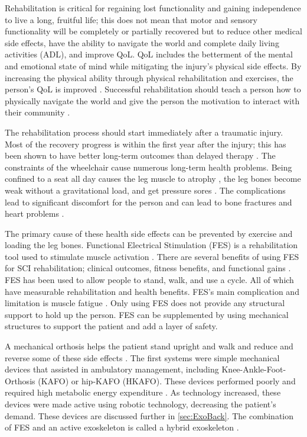  Rehabilitation is critical for regaining lost functionality and gaining independence to live a long, fruitful life; this does not mean that motor and sensory functionality will be completely or partially recovered but to reduce other medical side effects, have the ability to navigate the world and complete daily living activities (ADL), and improve QoL. QoL includes the betterment of the mental and emotional state of mind while mitigating the injury's physical side effects. By increasing the physical ability through physical rehabilitation and exercises, the person's QoL is improved \cite{noreau1995spinal}. Successful rehabilitation should teach a person how to physically navigate the world and give the person the motivation to interact with their community \cite{hammell2013spinal}.
 
 
 The rehabilitation process should start immediately after a traumatic injury. Most of the recovery progress is within the first year after the injury; this has been shown to have better long-term outcomes than delayed therapy \cite{scivoletto2005early} \cite{piepmeier1988late}.  The constraints of the wheelchair cause numerous long-term health problems. Being confined to a seat all day causes the leg muscle to atrophy \cite{castro1999influence}, the leg bones become weak \cite{goemaere1994bone} without a gravitational load, and get pressure sores \cite{wall2000preventing}. The complications lead to significant discomfort for the person and can lead to bone fractures and heart problems \cite{giangregorio2006bone}.  
 
 The primary cause of these health side effects can be prevented by exercise and loading the leg bones. Functional Electrical Stimulation (FES) is a rehabilitation tool used to stimulate muscle activation  \cite{quintero2012preliminary}. There are several benefits of using FES for SCI rehabilitation; clinical outcomes, fitness benefits, and functional gains \cite{hamid2008role}. FES has been used to allow people to stand, walk, and use a cycle\cite{mazzoleni2013fes}. All of which have measurable rehabilitation and health benefits. FES's main complication and limitation is muscle fatigue \cite{karu1995reducing}. Only using FES  does not provide any structural support to hold up the person. FES can be supplemented by using mechanical structures to support the patient and add a layer of safety. 
 
A mechanical orthosis helps the patient stand upright and walk and reduce and reverse some of these side effects \cite{palermo2017clinician}. The first systems were simple mechanical devices that assisted in ambulatory management, including Knee-Ankle-Foot-Orthosis (KAFO) or hip-KAFO (HKAFO). These devices performed poorly and required high metabolic energy expenditure \cite{del2012review}. As technology increased, these devices were made active using robotic technology, decreasing the patient's demand. These devices are discussed further in \autoref{sec:ExoBack}. The combination of FES and an active exoskeleton is called a hybrid exoskeleton \cite{ha2012enhancing} \cite{alouane2019hybrid}. 

